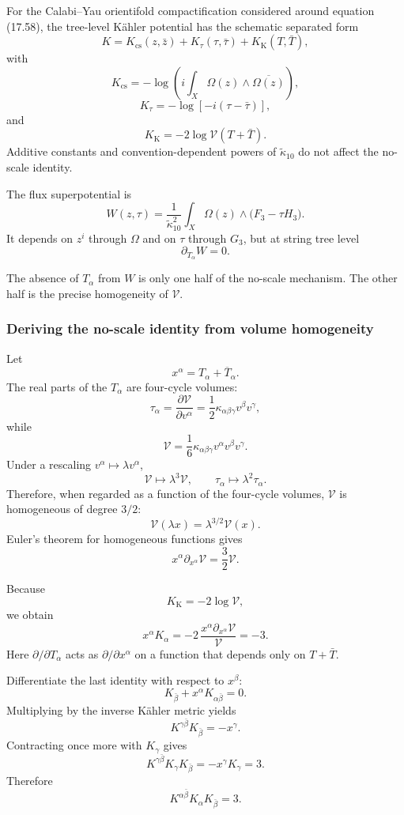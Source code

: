 \documentclass[
  10pt,
  a4paper,
  openany]{book}
\begin{document}
For the Calabi--Yau orientifold compactification considered around
equation (17.58), the tree-level Kähler potential has the schematic
separated form \[
K
=K_{\mathrm{cs}}(z,\bar z)
+K_\tau(\tau,\bar\tau)
+K_{\mathrm K}(T,\bar T),
\] with \[
K_{\mathrm{cs}}
=-\log\left(
i\int_X\Omega(z)\wedge\overline{\Omega(z)}
\right),
\] \[
K_\tau
=-\log[-i(\tau-\bar\tau)],
\] and \[
\boxed{
K_{\mathrm K}=-2\log\mathcal V(T+\bar T).
}
\] Additive constants and convention-dependent powers of
\(\tilde\kappa_{10}\) do not affect the no-scale identity.

The flux superpotential is \[
W(z,\tau)
=\frac{1}{\tilde\kappa_{10}^2}
\int_X\Omega(z)\wedge
\bigl(F_3-\tau H_3\bigr).
\] It depends on \(z^i\) through \(\Omega\) and on \(\tau\) through
\(G_3\), but at string tree level \[
\boxed{\partial_{T_\alpha}W=0.}
\]

The absence of \(T_\alpha\) from \(W\) is only one half of the no-scale
mechanism. The other half is the precise homogeneity of \(\mathcal V\).

\subsubsection{Deriving the no-scale identity from volume
homogeneity}\label{deriving-the-no-scale-identity-from-volume-homogeneity}

Let \[
x^\alpha=T_\alpha+\overline T_\alpha.
\] The real parts of the \(T_\alpha\) are four-cycle volumes: \[
\tau_\alpha
=\frac{\partial\mathcal V}{\partial v^\alpha}
=\frac12\kappa_{\alpha\beta\gamma}
v^\beta v^\gamma,
\] while \[
\mathcal V
=\frac16\kappa_{\alpha\beta\gamma}
v^\alpha v^\beta v^\gamma.
\] Under a rescaling \(v^\alpha\mapsto\lambda v^\alpha\), \[
\mathcal V\mapsto\lambda^3\mathcal V,
\qquad
\tau_\alpha\mapsto\lambda^2\tau_\alpha.
\] Therefore, when regarded as a function of the four-cycle volumes,
\(\mathcal V\) is homogeneous of degree \(3/2\): \[
\mathcal V(\lambda x)
=\lambda^{3/2}\mathcal V(x).
\] Euler's theorem for homogeneous functions gives \[
x^\alpha\partial_{x^\alpha}\mathcal V
=\frac32\mathcal V.
\]

Because \[
K_{\mathrm K}=-2\log\mathcal V,
\] we obtain \[
x^\alpha K_\alpha
=-2\,\frac{x^\alpha\partial_{x^\alpha}\mathcal V}
{\mathcal V}
=-3.
\] Here \(\partial/\partial T_\alpha\) acts as
\(\partial/\partial x^\alpha\) on a function that depends only on
\(T+\bar T\).

Differentiate the last identity with respect to \(x^\beta\): \[
K_{\bar\beta}
+x^\alpha K_{\alpha\bar\beta}
=0.
\] Multiplying by the inverse Kähler metric yields \[
K^{\gamma\bar\beta}K_{\bar\beta}
=-x^\gamma.
\] Contracting once more with \(K_\gamma\) gives \[
K^{\gamma\bar\beta}K_\gamma K_{\bar\beta}
=-x^\gamma K_\gamma
=3.
\] Therefore \[
\boxed{
K^{\alpha\bar\beta}K_\alpha K_{\bar\beta}=3.
}
\]
\end{document}
